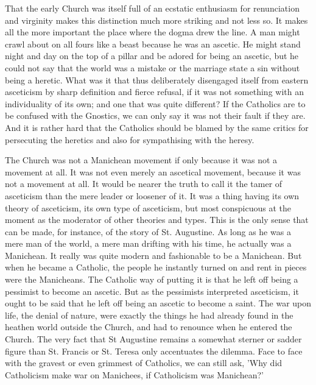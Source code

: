 That the early Church was itself full of an ecstatic enthusiasm for renunciation and virginity makes this distinction much more striking and not less so. It makes all the more important the place where the dogma drew the line. A man might crawl about on all fours like a beast because he was an ascetic. He might stand night and day on the top of a pillar and be adored for being an ascetic, but he could not say that the world was a mistake or the marriage state a sin without being a heretic. What was it that thus deliberately disengaged itself from eastern asceticism by sharp definition and fierce refusal, if it was not something with an individuality of its own; and one that was quite different? If the Catholics are to be confused with the Gnostics, we can only say it was not their fault if they are. And it is rather hard that the Catholics should be blamed by the same critics for persecuting the heretics and also for sympathising with the heresy.

The Church was not a Manichean movement if only because it was not a movement at all. It was not even merely an ascetical movement, because it was not a movement at all. It would be nearer the truth to call it the tamer of asceticism than the mere leader or loosener of it. It was a thing having its own theory of asceticism, its own type of asceticism, but most conspicuous at the moment as the moderator of other theories and types. This is the only sense that can be made, for instance, of the story of St. Augustine. As long as he was a mere man of the world, a mere man drifting with his time, he actually was a Manichean. It really was quite modern and fashionable to be a Manichean. But when he became a Catholic, the people he instantly turned on and rent in pieces were the Manicheans. The Catholic way of putting it is that he left off being a pessimist to become an ascetic. But as the pessimists interpreted asceticism, it ought to be said that he left off being an ascetic to become a saint. The war upon life, the denial of nature, were exactly the things he had already found in the heathen world outside the Church, and had to renounce when he entered the Church. The very fact that St Augustine remains a somewhat sterner or sadder figure than St. Francis or St. Teresa only accentuates the dilemma. Face to face with the gravest or even grimmest of Catholics, we can still ask, 'Why did Catholicism make war on Manichees, if Catholicism was Manichean?'

